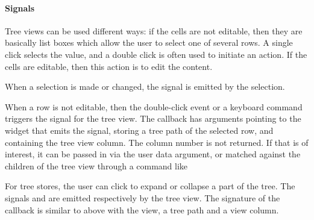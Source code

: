 \paragraph{Signals}
Tree views can be used different ways: if the cells are not editable,
then they are basically list boxes which allow the user to select one of
several rows. A single click selects the value, and a double click is
often used to initiate an action. If the cells are editable, then this
action is to edit the content.

When a selection is made or changed, the signal  is emitted by
the selection. 

When a row is not editable, then the double-click event or a keyboard
command triggers the  signal for the tree
view. The callback has arguments  pointing to the
widget that emits the signal,  storing a tree path of the
selected row, and  containing the tree view column. The
column number is not returned. If that is of interest, it can be
passed in via the user data argument, or matched against the children
of the tree view through a command like

\begin{Schunk}
\end{Schunk}


For tree stores, the user can click to expand or collapse a part of
the tree. The signals  and  are
emitted respectively by the tree view. The signature of the callback is similar to
above with the view, a tree path and a view column.



